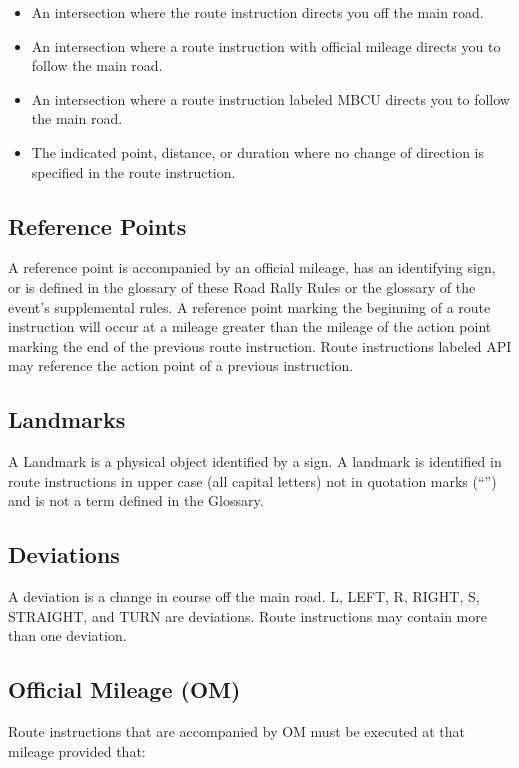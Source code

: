 \begin{itemize}

\item An intersection where the route instruction directs you off the main road.

\item An intersection where a route instruction with official mileage directs you to follow the main road.

\item An intersection where a route instruction labeled MBCU directs you to follow the main road.

\item The indicated point, distance, or duration where no change of direction is specified in the route instruction.

\end{itemize}

\subsection{Reference Points}
A reference point is accompanied by an official mileage, has an identifying sign, or is defined in the glossary of these Road Rally Rules or the glossary of the event's supplemental rules.  A reference point marking the beginning of a route instruction will occur at a mileage greater than the mileage of the action point marking the end of the previous route instruction.  Route instructions labeled API may reference the action point of a previous instruction.

\clearpage

\subsection{Landmarks}
A Landmark is a physical object identified by a sign.  A landmark is identified in route instructions in upper case (all capital letters) not in quotation marks (``'') and is not a term defined in the Glossary.

\subsection{Deviations}
A deviation is a change in course off the main road. L, LEFT, R, RIGHT, S, STRAIGHT, and TURN are deviations.  Route instructions may contain more than one deviation.

\subsection{Official Mileage (OM)}
Route instructions that are accompanied by OM must be executed at that mileage provided that:

